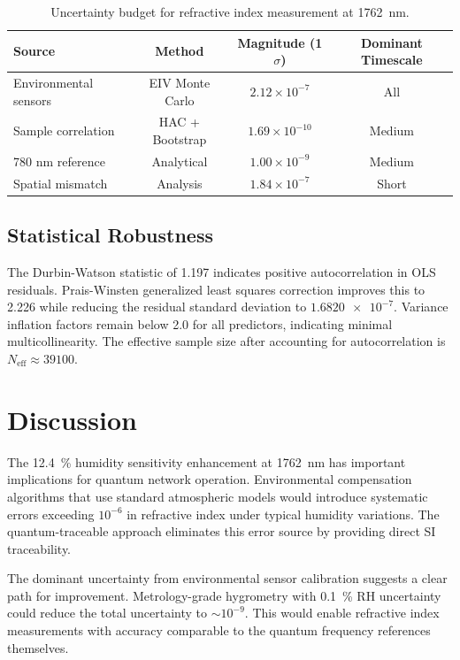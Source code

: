 \documentclass[aps,pra,reprint,groupedaddress,twocolumn,superscriptaddress,linenumbers]{revtex4-2}
\begin{document}
\begin{table}[ht]
\centering
\caption{Uncertainty budget for refractive index measurement at \SI{1762}{\nano\meter}.}
\begin{tabular}{lccc}
\toprule
\textbf{Source} & \textbf{Method} & \textbf{Magnitude (1$\sigma$)} & \textbf{Dominant Timescale} \\
\midrule
Environmental sensors & EIV Monte Carlo & $2.12 \times 10^{-7}$ & All \\
Sample correlation & HAC + Bootstrap & $1.69 \times 10^{-10}$ & Medium \\
780 nm reference & Analytical & $1.00 \times 10^{-9}$ & Medium \\
Spatial mismatch & Analysis & $1.84 \times 10^{-7}$ & Short \\
\bottomrule
\end{tabular}
\label{tab:uncertainty}
\end{table}

\subsection{Statistical Robustness}

The Durbin-Watson statistic of 1.197 indicates positive autocorrelation in OLS residuals. Prais-Winsten generalized least squares correction improves this to 2.226 while reducing the residual standard deviation to $\num{1.6820e-7}$. Variance inflation factors remain below 2.0 for all predictors, indicating minimal multicollinearity. The effective sample size after accounting for autocorrelation is $N_{\text{eff}} \approx \num{39100}$.

\section{Discussion}

The \SI{12.4}{\percent} humidity sensitivity enhancement at \SI{1762}{\nano\meter} has important implications for quantum network operation. Environmental compensation algorithms that use standard atmospheric models would introduce systematic errors exceeding $10^{-6}$ in refractive index under typical humidity variations. The quantum-traceable approach eliminates this error source by providing direct SI traceability.

The dominant uncertainty from environmental sensor calibration suggests a clear path for improvement. Metrology-grade hygrometry with \SI{0.1}{\percent} RH uncertainty could reduce the total uncertainty to $\sim 10^{-9}$. This would enable refractive index measurements with accuracy comparable to the quantum frequency references themselves.
\end{document}

